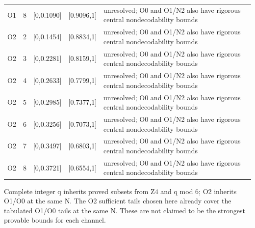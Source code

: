 \documentclass[11pt,a4paper]{article}
\begin{document}
{\begin{longtable}
{}O1 & 8 & [0,0.1090] & [0.9096,1] & unresolved; O0 and O1/\allowbreak{}N2 also have rigorous central nondecodability bounds\tabularnewline
{}O2 & 2 & [0,0.1454] & [0.8834,1] & unresolved; O0 and O1/\allowbreak{}N2 also have rigorous central nondecodability bounds\tabularnewline
{}O2 & 3 & [0,0.2281] & [0.8159,1] & unresolved; O0 and O1/\allowbreak{}N2 also have rigorous central nondecodability bounds\tabularnewline
{}O2 & 4 & [0,0.2633] & [0.7799,1] & unresolved; O0 and O1/\allowbreak{}N2 also have rigorous central nondecodability bounds\tabularnewline
{}O2 & 5 & [0,0.2985] & [0.7377,1] & unresolved; O0 and O1/\allowbreak{}N2 also have rigorous central nondecodability bounds\tabularnewline
{}O2 & 6 & [0,0.3256] & [0.7073,1] & unresolved; O0 and O1/\allowbreak{}N2 also have rigorous central nondecodability bounds\tabularnewline
{}O2 & 7 & [0,0.3497] & [0.6803,1] & unresolved; O0 and O1/\allowbreak{}N2 also have rigorous central nondecodability bounds\tabularnewline
{}O2 & 8 & [0,0.3721] & [0.6554,1] & unresolved; O0 and O1/\allowbreak{}N2 also have rigorous central nondecodability bounds\tabularnewline
\bottomrule
\end{longtable}
}

Complete integer q inherits proved subsets from Z4 and q mod 6; O2 inherits O1/\allowbreak{}O0 at the same N. The O2 sufficient tails chosen here already cover the tabulated O1/\allowbreak{}O0 tails at the same N. These are not claimed to be the strongest provable bounds for each channel.
\end{document}
